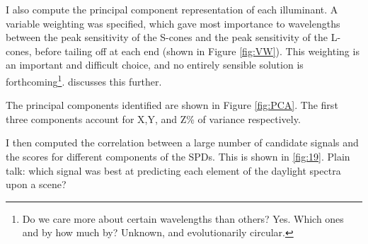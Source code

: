 I also compute the principal component representation of each illuminant. A variable weighting was specified, which gave most importance to wavelengths between the peak sensitivity of the S-cones and the peak sensitivity of the L-cones, before tailing off at each end (shown in Figure \ref{fig:VW}). This weighting is an important and difficult choice, and no entirely sensible solution is forthcoming\footnote{Do we care more about certain wavelengths than others? Yes. Which ones and by how much by? Unknown, and evolutionarily circular.}. \citet{maloney_evaluation_1986} discusses this further. %


The principal components identified are shown in Figure \ref{fig:PCA}. The first three components account for X,Y, and Z\% of variance respectively.



I then computed the correlation between a large number of candidate signals and the scores for different components of the \glspl{SPD}. This is shown in \ref{fig:19}. Plain talk: which signal was best at predicting each element of the daylight spectra upon a scene?







